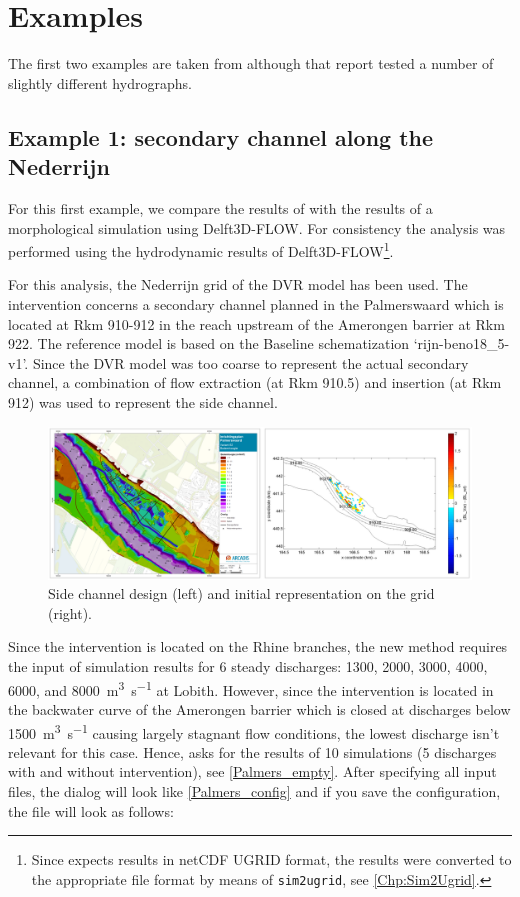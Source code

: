 \chapter{Examples}

The first two examples are taken from \citet{GiriJagers2022} although that report tested a number of slightly different hydrographs.

\section{Example 1: secondary channel along the Nederrijn}

For this first example, we compare the results of \dfastmi with the results of a morphological simulation using Delft3D-FLOW.
For consistency the \dfastmi analysis was performed using the hydrodynamic results of Delft3D-FLOW\footnote{Since \dfastmi expects \dflowfm results in netCDF UGRID format, the results were converted to the appropriate file format by means of \texttt{sim2ugrid}, see \autoref{Chp:Sim2Ugrid}.}.

For this analysis, the Nederrijn grid of the DVR model has been used.
The intervention concerns a secondary channel planned in the Palmerswaard which is located at Rkm 910-912 in the reach upstream of the Amerongen barrier at Rkm 922.
The reference model is based on the Baseline schematization ‘rijn-beno18\_5-v1’.
Since the DVR model was too coarse to represent the actual secondary channel, a combination of flow extraction (at Rkm 910.5) and insertion (at Rkm 912) was used to represent the side channel.

\begin{figure}
\includegraphics[width=\columnwidth]{figures/Palmerswaard_proj.png}
\caption{Side channel design (left) and initial representation on the grid (right).}
\label{Palmers_proj}
\end{figure}

Since the intervention is located on the Rhine branches, the new \dfastmi method requires the input of simulation results for 6 steady discharges: 1300, 2000, 3000, 4000, 6000, and \SI{8000}{\metre\cubed\per\second} at Lobith.
However, since the intervention is located in the backwater curve of the Amerongen barrier which is closed at discharges below \SI{1500}{\metre\cubed\per\second} causing largely stagnant flow conditions, the lowest discharge isn't relevant for this case.
Hence, \dfmi asks for the results of 10 simulations (5 discharges with and without intervention), see \autoref{Palmers_empty}.
After specifying all input files, the dialog will look like \autoref{Palmers_config} and if you save the configuration, the file will look as follows:

